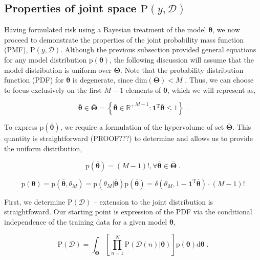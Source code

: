 \documentclass[12pt]{article}
\begin{document}
\subsection{Properties of joint space $\text{P}(y,\mathcal{D})$}

Having formulated risk using a Bayesian treatment of the model $\bm{\theta}$, we now proceed to demonstrate the properties of the joint probability mass function (PMF), $\text{P}(y,\mathcal{D})$. Although the previous subsection provided general equations for any model distribution $\text{p}(\bm{\theta})$, the following discussion will assume that the model distribution is uniform over $\bm{\Theta}$. Note that the probability distribution function (PDF) for $\bm{\theta}$ is degenerate, since $\text{dim}(\bm{\Theta}) < M$ . Thus, we can choose to focus exclusively on the first $M-1$ elements of $\bm{\theta}$, which we will represent as,

\begin{equation}
\bar{\bm{\theta}} \in \bar{\bm{\Theta}} = \left\{ \bar{\bm{\theta}} \in {\mathbb{R}^+}^{M-1}: \bm{1}^\text{T}\bar{\bm{\theta}} \leq 1 \right\} \;.
\end{equation}

To express $\text{p}\left(\bar{\bm{\theta}}\right)$, we require a formulation of the hypervolume of set $\bar{\bm{\Theta}}$. This quantity is straightforward (PROOF???) to determine and allows us to provide the uniform distribution,

\begin{equation}
\text{p}\left(\bar{\bm{\theta}}\right)= (M-1)!,  \forall \bar{\bm{\theta}} \in \bar{\bm{\Theta}} \;.
\end{equation}

\begin{equation}
\text{p}(\bm{\theta}) = \text{p}(\bar{\bm{\theta}},\theta_M) = \text{p}\left( \theta_M | \bar{\bm{\theta}} \right) \text{p}\left(\bar{\bm{\theta}}\right)
= \delta\left( \theta_M,1-\bm{1}^\text{T}\bar{\bm{\theta}} \right) \cdot  (M-1)!
\end{equation}

First, we determine $\text{P}(\mathcal{D})$ -- extension to the joint distribution is straightfoward. Our starting point is expression of the PDF via the conditional independence of the training data for a given model $\bm{\theta}$,

\begin{equation}
\text{P}(\mathcal{D}) = \int_{\bm{\Theta}} \left[ \prod_{n=1}^N \text{P}(\mathcal{D}(n) | \bm{\theta}) \right] \text{p}(\bm{\theta}) \mathrm{d}\bm{\theta} \;.
\end{equation}
\end{document}

